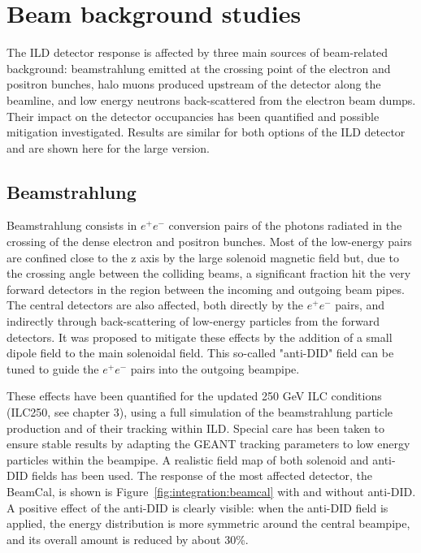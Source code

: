 \section{Beam background studies}
\label{ild:sec:beam_backgrounds}
The ILD detector response is affected by three main sources of beam-related background: beamstrahlung emitted at the crossing point of the electron and positron bunches, halo muons produced upstream of the detector along the beamline, and low energy neutrons back-scattered from the electron beam dumps. Their impact on the detector occupancies has been quantified and possible mitigation investigated. Results are similar for both options of the ILD detector and are shown here for the large version.

\subsection{Beamstrahlung}

Beamstrahlung consists in $e^+e^-$ conversion pairs of the photons radiated in the crossing of the dense electron and positron bunches. Most of the low-energy pairs are confined close to the z axis by the large solenoid magnetic field but, due to the crossing angle between the colliding beams, a significant fraction hit the very forward detectors in the region between the incoming and outgoing beam pipes. The central detectors are also affected, both directly by the $e^+e^-$ pairs, and indirectly through back-scattering of low-energy particles from the forward detectors. It was proposed to mitigate these effects by the addition of a small dipole field to the main solenoidal field. This so-called "anti-DID" field can be tuned to guide the $e^+e^-$ pairs into the outgoing beampipe. 

These effects have been quantified for the updated 250 GeV ILC conditions (ILC250, see chapter 3), using a full simulation of the beamstrahlung particle production and of their tracking within ILD. Special care has been taken to ensure stable results by adapting the GEANT tracking parameters to low energy particles within the beampipe. A realistic field map of both solenoid and anti-DID fields has been used. The response of the most affected detector, the BeamCal, is shown is Figure~\ref{fig:integration:beamcal} with and without anti-DID. A positive effect of the anti-DID is clearly visible: when the anti-DID field is applied, the energy distribution is more symmetric around the central beampipe, and its overall amount is reduced by about 30\%.

